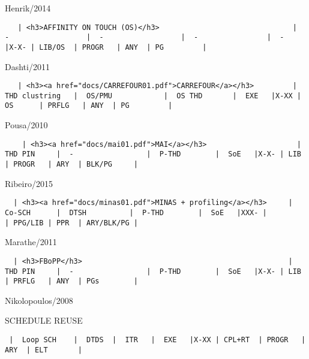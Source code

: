 \documentclass[11pt]{article}
\begin{document}
Henrik/2014

\begin{verbatim}
   | <h3>AFFINITY ON TOUCH (OS)</h3>                               |  -                  |  -                  |  -                |  -     |X-X- | LIB/OS  | PROGR   | ANY  | PG         |
\end{verbatim}

\textbar{}

Dashti/2011

\begin{verbatim}
   | <h3><a href="docs/CARREFOUR01.pdf">CARREFOUR</a></h3>         |  THD clustring   |  OS/PMU            |  OS THD       |  EXE   |X-XX | OS      | PRFLG   | ANY  | PG         |
\end{verbatim}

\textbar{}

Pousa/2010

\begin{verbatim}
    | <h3><a href="docs/mai01.pdf">MAI</a></h3>                     |  THD PIN     |  -                 |  P-THD        |  SoE   |X-X- | LIB     | PROGR   | ARY  | BLK/PG     |
\end{verbatim}

\textbar{}

Ribeiro/2015

\begin{verbatim}
  | <h3><a href="docs/minas01.pdf">MINAS + profiling</a></h3>     |  Co-SCH      |  DTSH          |  P-THD        |  SoE   |XXX- |         | PPG/LIB | PPR  | ARY/BLK/PG |
\end{verbatim}

\textbar{}

Marathe/2011

\begin{verbatim}
  | <h3>FBoPP</h3>                                                |  THD PIN     |  -                 |  P-THD        |  SoE   |X-X- | LIB     | PRFLG   | ANY  | PGs        |
\end{verbatim}

\textbar{}

Nikolopoulos/2008

\textbar{}

SCHEDULE REUSE

\begin{verbatim}
 |  Loop SCH    |  DTDS  |  ITR   |  EXE   |X-XX | CPL+RT  | PROGR   | ARY  | ELT       |
\end{verbatim}

\textbar{}
\end{document}
